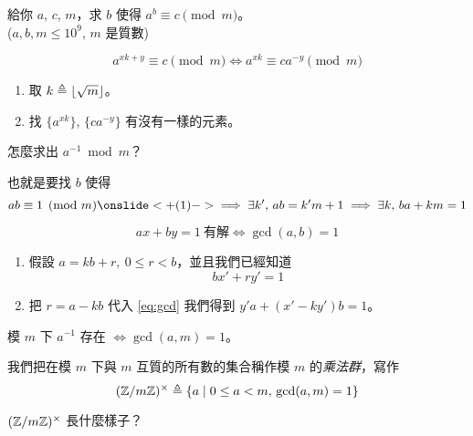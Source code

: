 \documentclass[standalone]{beamer}
\begin{document}
\begin{frame}{}
  \begin{problem}
    給你 $a$, $c$, $m$，求 $b$ 使得 $a^b \equiv c \pmod{m}$。\\
    ($a, b, m \leq 10^{9}$, $m$ 是質數)
  \end{problem} \pause \disskip
  \[ a^{xk + y} \equiv c \pmod{m} \iff a^{xk} \equiv c a^{-y} \pmod{m} \]
  \pause \disskip
  \begin{enumerate}
    \item 取 $k \triangleq \lfloor \sqrt{m} \rfloor$。
    \item 找 $\{a^{xk}\}$, $\{c a^{-y}\}$ 有沒有一樣的元素。
  \end{enumerate}
  \pause
  \begin{missue}
    \centering
    怎麼求出 $a^{-1} \bmod m$？
  \end{missue}
\end{frame}

\begin{frame}{}
  也就是要找 $b$ 使得
  \[ a b \equiv 1 \pmod{m} \onslide<+(1)->{\implies \exists k',\, ab = k'm + 1 \implies \exists k,\, ba + km = 1}\]
  \pause \disskip
  \begin{theorem}[$ax + by = 1$ 有解的條件] \vspace*{-0.5\baselineskip}
    \[ ax + by = 1 \ \text{有解} \iff \gcd(a, b) = 1 \]
  \end{theorem}
  \pause \disskip
  \begin{enumerate}[<+->]
    \item 假設 $a = kb + r, \ 0 \leq r < b$，並且我們已經知道 
      \begin{equation}
        bx' + ry' = 1 \label{eq:gcd}
      \end{equation}
    \item 把 $r = a - kb$ 代入 \eqref{eq:gcd} 我們得到 $y'a + (x' - ky')b = 1$。
  \end{enumerate}
\end{frame}

\begin{frame}{}
  \begin{theorem}[模逆元存在的條件]
   模 $m$ 下 $a^{-1}$ 存在 $\iff \gcd(a, m) = 1$。
  \end{theorem}
  \pause

  我們把在模 $m$ 下與 $m$ 互質的所有數的集合稱作模 $m$ 的\emph{乘法群}，寫作
  \[ (\mathbb{Z} / m\mathbb{Z})^\times \triangleq \{ a \mid 0 \leq a < m,\, \gcd(a, m) = 1 \} \]
  \pause
  \begin{missue}
    \centering
    $(\mathbb{Z} / m\mathbb{Z})^\times$ 長什麼樣子？
  \end{missue}
\end{frame}
\end{document}
